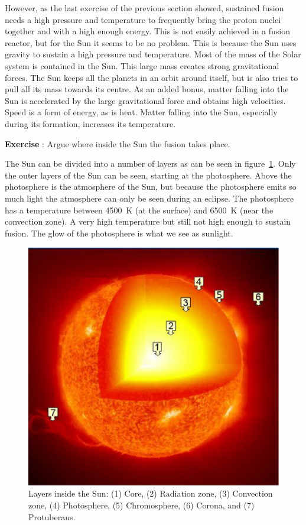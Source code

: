 \documentclass[12pt,a4paper]{article}
\numberwithin{equation}{section}
\numberwithin{figure}{section}
\newcounter{Exercise}
\numberwithin{table}{section}
\begin{document}
However, as the last exercise of the previous section showed, sustained fusion needs a high pressure and temperature to frequently bring the proton nuclei together and with a high enough energy. This is not easily achieved in a fusion reactor, but for the Sun it seems to be no problem. This is because the Sun uses gravity to sustain a high pressure and temperature. Most of the mass of the Solar system is contained in the Sun. This large mass creates strong gravitational forces. The Sun keeps all the planets in an orbit around itself, but is also tries to pull all its mass towards its centre. As an added bonus, matter falling into the Sun is accelerated by the large gravitational force and obtains high velocities. Speed is a form of energy, as is heat. Matter falling into the Sun, especially during its formation, increases its temperature.

\begin{shaded}
\textbf{Exercise \theExercise {}} : Argue where inside the Sun the fusion takes place.\end{shaded}

The Sun can be divided into a number of layers as can be seen in figure~\ref{fig:sun_layers}. Only the outer layers of the Sun can be seen, starting at the photosphere. Above the photosphere is the atmosphere of the Sun, but because the photosphere emits so much light the atmosphere can only be seen during an eclipse. The photosphere has a temperature between 4500~K (at the surface) and 6500~K (near the convection zone). A very high temperature but still not high enough to sustain fusion. The glow of the photosphere is what we see as sunlight.

\begin{figure}\begin{center}
\includegraphics[scale=0.7]{Sun_layers.eps}
\caption{Layers inside the Sun: (1) Core, (2) Radiation zone, (3) Convection zone, (4) Photosphere, (5) Chromosphere, (6) Corona, and (7) Protuberans.}\label{fig:sun_layers}
\end{center}\end{figure}
\end{document}
